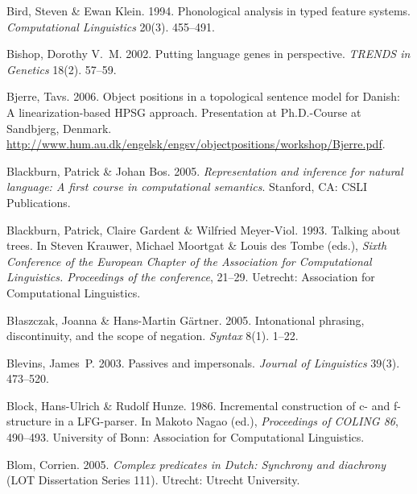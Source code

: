\begin{thebibliography}{1420}
Bird, Steven \& Ewan Klein. 1994.
\newblock Phonological analysis in typed feature systems.
\newblock \emph{Computational Linguistics} 20(3). 455--491.

Bishop, Dorothy V.~M. 2002.
\newblock Putting language genes in perspective.
\newblock \emph{TRENDS in Genetics} 18(2). 57--59.

Bjerre, Tavs. 2006.
\newblock Object positions in a topological sentence model for {Danish}: {A}
  lin\-e\-ar\-i\-za\-tion-based {HPSG} approach.
\newblock Presentation at Ph.D.-Course at Sandbjerg, Denmark.
\newblock
  \urlprefix\url{http://www.hum.au.dk/engelsk/engsv/objectpositions/workshop/Bjerre.pdf}.

Blackburn, Patrick \& Johan Bos. 2005.
\newblock \emph{Representation and inference for natural language: {A} first
  course in computational semantics}.
\newblock Stanford, CA: CSLI Publications.

Blackburn, Patrick, Claire Gardent \& Wilfried Meyer-Viol. 1993.
\newblock Talking about trees.
\newblock In Steven Krauwer, Michael Moortgat \& Louis des Tombe (eds.),
  \emph{{Sixth Conference of the European Chapter of the Association for
  Computational Linguistics. Proceedings} of the conference}, 21--29. Uetrecht:
  Association for Computational Linguistics.

B{\l}aszczak, Joanna \& Hans-Martin G{\"a}rtner. 2005.
\newblock Intonational phrasing, discontinuity, and the scope of negation.
\newblock \emph{Syntax} 8(1). 1--22.

Blevins, James~P. 2003.
\newblock Passives and impersonals.
\newblock \emph{Journal of Linguistics} 39(3). 473--520.

Block, Hans-Ulrich \& Rudolf Hunze. 1986.
\newblock Incremental construction of c- and f-structure in a {LFG}-parser.
\newblock In Makoto Nagao (ed.), \emph{Proceedings of {COLING} 86}, 490--493.
  University of Bonn: Association for Computational Linguistics.

Blom, Corrien. 2005.
\newblock \emph{Complex predicates in {Dutch}: {Synchrony} and diachrony}
  ({LOT} Dissertation Series 111).
\newblock Utrecht: Utrecht University.


\end{thebibliography}
